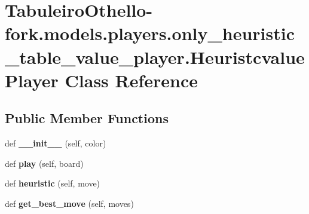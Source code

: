 \hypertarget{class_tabuleiro_othello-fork_1_1models_1_1players_1_1only__heuristic__table__value__player_1_1_heuristcvalue_player}{}\section{Tabuleiro\+Othello-\/fork.models.\+players.\+only\+\_\+heuristic\+\_\+table\+\_\+value\+\_\+player.\+Heuristcvalue\+Player Class Reference}
\label{class_tabuleiro_othello-fork_1_1models_1_1players_1_1only__heuristic__table__value__player_1_1_heuristcvalue_player}
\subsection*{Public Member Functions}
\begin{DoxyCompactItemize}
\item 
\hypertarget{class_tabuleiro_othello-fork_1_1models_1_1players_1_1only__heuristic__table__value__player_1_1_heuristcvalue_player_a1f31897f1c9caa6762653419fa1e47bc}{}def {\bfseries \+\_\+\+\_\+init\+\_\+\+\_\+} (self, color)\label{class_tabuleiro_othello-fork_1_1models_1_1players_1_1only__heuristic__table__value__player_1_1_heuristcvalue_player_a1f31897f1c9caa6762653419fa1e47bc}

\item 
\hypertarget{class_tabuleiro_othello-fork_1_1models_1_1players_1_1only__heuristic__table__value__player_1_1_heuristcvalue_player_aa02fa858794d5305810ed7e941a850f3}{}def {\bfseries play} (self, board)\label{class_tabuleiro_othello-fork_1_1models_1_1players_1_1only__heuristic__table__value__player_1_1_heuristcvalue_player_aa02fa858794d5305810ed7e941a850f3}

\item 
\hypertarget{class_tabuleiro_othello-fork_1_1models_1_1players_1_1only__heuristic__table__value__player_1_1_heuristcvalue_player_ab553e40d70dcc7af73c5d346e5e3f06a}{}def {\bfseries heuristic} (self, move)\label{class_tabuleiro_othello-fork_1_1models_1_1players_1_1only__heuristic__table__value__player_1_1_heuristcvalue_player_ab553e40d70dcc7af73c5d346e5e3f06a}

\item 
\hypertarget{class_tabuleiro_othello-fork_1_1models_1_1players_1_1only__heuristic__table__value__player_1_1_heuristcvalue_player_a0ca0cb0d81d4efda727650e5b6fdc9c1}{}def {\bfseries get\+\_\+best\+\_\+move} (self, moves)\label{class_tabuleiro_othello-fork_1_1models_1_1players_1_1only__heuristic__table__value__player_1_1_heuristcvalue_player_a0ca0cb0d81d4efda727650e5b6fdc9c1}

\end{DoxyCompactItemize}
